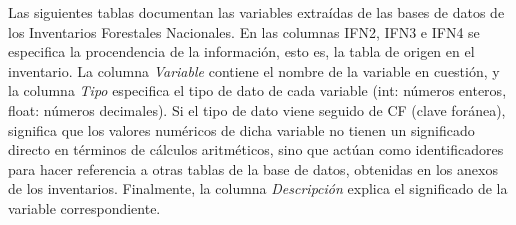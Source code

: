 \medskip
\medskip

Las siguientes tablas documentan las variables extraídas de las bases de datos de los Inventarios Forestales Nacionales. En las columnas IFN2, IFN3 e IFN4 se especifica la procendencia de la información, esto es, la tabla de origen en el inventario. La columna \textit{Variable} contiene el nombre de la variable en cuestión, y la columna \textit{Tipo} especifica el tipo de dato de cada variable (int: números enteros, float: números decimales). Si el tipo de dato viene seguido de CF (clave foránea), significa que los valores numéricos de dicha variable no tienen un significado directo en términos de cálculos aritméticos, sino que actúan como identificadores para hacer referencia a otras tablas de la base de datos, obtenidas en los anexos de los inventarios. Finalmente, la columna \textit{Descripción} explica el significado de la variable correspondiente.

